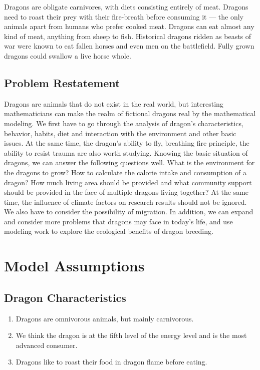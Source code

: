 Dragons are obligate carnivores, with diets consisting entirely of meat. Dragons need to roast their prey with their fire-breath before consuming it --- the only animals apart from humans who prefer cooked meat. Dragons can eat almost any kind of meat, anything from sheep to fish. Historical dragons ridden as beasts of war were known to eat fallen horses and even men on the battlefield. Fully grown dragons could swallow a live horse whole\cite{TeXBook}.

\subsection{Problem Restatement}
Dragons are animals that do not exist in the real world, but interesting mathematicians can make the realm of fictional dragons real by the mathematical modeling. We first have to go through the analysis of dragon's characteristics, behavior, habits, diet and interaction with the environment and other basic issues. At the same time, the dragon's ability to fly, breathing fire principle, the ability to resist trauma are also worth studying. Knowing the basic situation of dragons, we can answer the following questions well. What is the environment for the dragons to grow? How to calculate the calorie intake and consumption of a dragon? How much living area should be provided and what community support should be provided in the face of multiple dragons living together? At the same time, the influence of climate factors on research results should not be ignored. We also have to consider the possibility of migration. In addition, we can expand and consider more problems that dragons may face in today's life, and use modeling work to explore the ecological benefits of dragon breeding.

\section{Model Assumptions}

\subsection{Dragon Characteristics}
\begin{enumerate}[(1)]
    \item Dragons are omnivorous animals, but mainly carnivorous.
    \item We think the dragon is at the fifth level of the energy level and is the most advanced consumer.
    \item Dragons like to roast their food in dragon flame before eating.
\end{enumerate}

